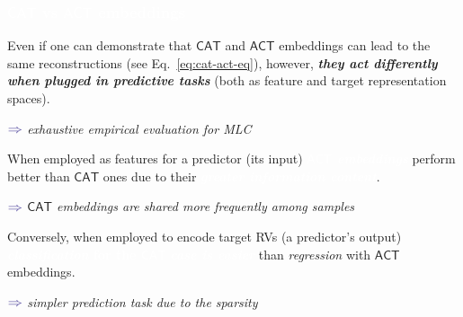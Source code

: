 \documentclass[xcolor={usenames,dvipsnames,svgnames}, compress]{beamer}
\newcommand{\highlighttext}[2][yellow]{{\colorbox{#1}{\textcolor{white}{#2}}}}
\begin{document}
\begin{frame}[t]
  \frametitle{\highlighttext[bgrey3]{$\mathsf{CAT}$ vs $\mathsf{ACT}$
    embeddings}}
  \footnotesize
  Even if one can demonstrate that $\mathsf{CAT}$ and $\mathsf{ACT}$
embeddings can lead to the same reconstructions (see
Eq.~\ref{eq:cat-act-eq}), however, \emph{\textbf{they act differently when plugged
in predictive tasks}} (both as feature and target representation spaces).
\begin{minipage}{1.0\linewidth}
      \raggedleft
      $\color{violet}\boldsymbol\Rightarrow$
      \scriptsize
     \emph{exhaustive empirical evaluation for MLC}
\end{minipage}
\par\bigskip

When employed as features for a predictor (its input)
\highlighttext[tomato0]{\emph{\textbf{$\mathsf{ACT}$ embeddings}}} perform better than $\mathsf{CAT}$ ones
due to their \highlighttext[tomato0]{\emph{\textbf{greater information content}}}.
\begin{minipage}{1.0\linewidth}
     \vspace{7pt}
      \raggedleft
      $\color{violet}\boldsymbol\Rightarrow$
      \scriptsize
     \emph{$\mathsf{CAT}$ embeddings are shared more frequently among samples}
\end{minipage}
\par\bigskip

Conversely, when employed to encode target RVs (a predictor's output)
\highlighttext[tomato0]{\textbf{\emph{classification} for the $\mathsf{CAT}$}
\textbf{\emph{case is easier}}} than \emph{regression} with $\mathsf{ACT}$ embeddings.
\begin{minipage}{1.0\linewidth}
    \vspace{7pt}
      \raggedleft
      $\color{violet}\boldsymbol\Rightarrow$
      \scriptsize
     \emph{simpler prediction task due to the sparsity}
\end{minipage}
\end{frame}
\end{document}
